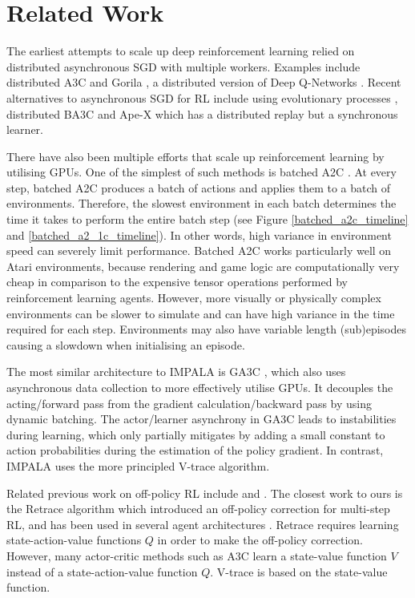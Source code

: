 \section{Related Work}
\label{sec:related_work}


The earliest attempts to scale up deep reinforcement learning relied on distributed asynchronous SGD \cite{NIPS2012_4687} with multiple workers.
Examples include distributed A3C \cite{A3C2016} and Gorila \cite{DBLP:journals/corr/NairSBAFMPSBPLM15}, a distributed version of Deep Q-Networks \cite{mnih15human}. Recent alternatives to asynchronous SGD for RL include using evolutionary processes \cite{salimans2017evolution}, distributed BA3C \cite{DBLP:journals/corr/abs-1801-02852} and Ape-X \cite{horgan2018distributed} which has a distributed replay but a synchronous learner.

There have also been multiple efforts that scale up reinforcement learning by utilising GPUs. One of the simplest of such methods is batched A2C \cite{DBLP:journals/corr/ClementeMC17}.
At every step, batched A2C produces a batch of actions and applies them to a batch of environments.
Therefore, the slowest environment in each batch determines the time it takes to perform the entire batch step (see Figure \ref{batched_a2c_timeline} and \ref{batched_a2_1c_timeline}). In other words, high variance in environment speed can severely limit performance.
Batched A2C works particularly well on Atari environments, because rendering and game logic are computationally very cheap in comparison to the expensive tensor operations performed by reinforcement learning agents.
However, more visually or physically complex environments can be slower to simulate and can have high variance in the time required for each step. Environments may also have variable length (sub)episodes causing a slowdown when initialising an episode.





The most similar architecture to IMPALA is GA3C \cite{babaeizadeh2016ga3c}, which also uses asynchronous data collection to more effectively utilise GPUs. It decouples the acting/forward pass from the gradient calculation/backward pass by using dynamic batching. The actor/learner asynchrony in GA3C 
leads to instabilities during learning, which \cite{babaeizadeh2016ga3c} only partially mitigates by adding a small constant to action probabilities during the estimation of the policy gradient.
In contrast, IMPALA uses the more principled V-trace algorithm.

Related previous work on off-policy RL include \cite{precup2000eligibility,precup01offpolicy,Wawrzynski09,geist2014off,o2016pgq} and \cite{harutyunyan16qlambda}.
The closest work to ours is the Retrace algorithm  \cite{munos2016safe} which introduced an off-policy correction for multi-step RL, and has been used in several agent architectures \cite{Ziyu2017,Reactor2017}. Retrace requires learning state-action-value functions $Q$ in order to make the off-policy correction.
However, many actor-critic methods such as A3C learn a state-value function $V$ instead of a state-action-value function $Q$.
V-trace is based on the state-value function.